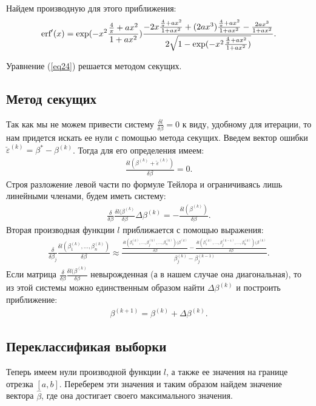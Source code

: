 Найдем производную для этого приближения:
\begin{eqnarray}
    \label{eq26}\textup{erf}'(x) = \exp(-x^2 \frac{\frac{4}{\pi}+ax^2}{1+ax^2}) \frac{-2x\frac{\frac{4}{\pi}+ax^2}{1+ax^2}+(2ax^3)\frac{\frac{4}{\pi}+ax^2}{1+ax^2}-\frac{2ax^3}{1+ax^2}}{2\sqrt{1- \exp(-x^2 \frac{\frac{4}{\pi}+ax^2}{1+ax^2})}}.
\end{eqnarray}

Уравнение (\ref{eq24}) решается методом секущих.


\subsection{Метод секущих}\label{sec4_2}
Так как мы не можем привести систему $ \frac{\delta l}{\delta \beta}=0$ к виду, удобному для итерации, то нам придется искать ее нули с помощью метода секущих.
Введем вектор ошибки $\check{\varepsilon}^{(k)}=\beta^{*}-\beta^{(k)}$. Тогда для его определения имеем:
\begin{eqnarray}
    \frac{\delta l (\beta^{(k)}+\check{\varepsilon}^{(k)})}{\delta \beta}=0.
\end{eqnarray}
Строя разложение левой части по формуле Тейлора и ограничиваясь лишь линейными членами\cite{NumericalMethods}, будем иметь систему:
\begin{eqnarray}
    \frac{\delta }{\delta \beta}\frac{\delta l (\beta^{(k)}}{\delta \beta}\Delta \beta^{(k)}=-\frac{\delta l (\beta^{(k)})}{\delta \beta}.
\end{eqnarray}
Вторая производная функции $l$ приближается с помощью выражения:
\begin{eqnarray}
    \frac{\delta }{\delta \beta_j}\frac{\delta l(\beta_1^{(k)},\dots, \beta_n^{(k)}) }{\delta \beta}\approx \frac{\frac{\delta l(\beta_1^{(k)},\dots,\beta_j^{(k)},\dots, \beta_n^{(k)}) (\beta^{(k)}}{\delta \beta}-\frac{\delta l(\beta_1^{(k)},\dots,\beta_j^{(k-1)},\dots, \beta_n^{(k)}) (\beta^{(k)}}{\delta \beta}}{\beta_j^{(k)}-\beta_j^{(k-1)}}.
\end{eqnarray}
Если матрица $\frac{\delta }{\delta \beta}\frac{\delta l (\beta^{(k)}}{\delta \beta}$ невырожденная (а в нашем случае она диагональная), то из этой системы можно единственным образом найти $\Delta \beta^{(k)}$ и построить приближение:
\begin{eqnarray}
    \beta^{(k+1)}=\beta^{(k)}+\Delta \beta^{(k)}.
\end{eqnarray}

\subsection{Переклассификая выборки}
Теперь имеем нули производной функции $l$, а также ее значения на границе отрезка $[a,b]$.
Переберем эти значения и таким образом найдем значение вектора $\hat{\beta}$, где она достигает своего максимального значения.

